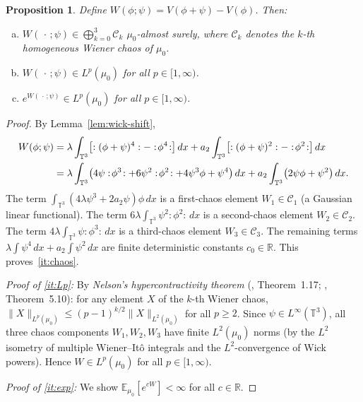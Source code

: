 \documentclass[12pt]{article}
\newtheorem{proposition}[theorem]{Proposition}
\theoremstyle{definition}
\begin{document}
\begin{proposition}
\label{prop:W}
Define $W(\phi;\psi) = V(\phi+\psi) - V(\phi)$. Then:
\begin{enumerate}[(a)]
  \item\label{it:chaos} $W(\,\cdot\,;\psi) \in \bigoplus_{k=0}^{3}\mathcal{C}_k$ $\mu_0$-almost
    surely, where $\mathcal{C}_k$ denotes the $k$-th homogeneous Wiener chaos of $\mu_0$.
  \item\label{it:Lp} $W(\,\cdot\,;\psi) \in L^p(\mu_0)$ for all $p \in [1,\infty)$.
  \item\label{it:exp} $e^{W(\,\cdot\,;\psi)} \in L^p(\mu_0)$ for all $p \in [1,\infty)$.
\end{enumerate}
\end{proposition}

\begin{proof}
By Lemma~\ref{lem:wick-shift},
\begin{align}
  W(\phi;\psi)
  &= \lambda\int_{\mathbb{T}^3}\bigl[:(\phi+\psi)^4: - :\!\phi^4\!:\bigr]\,dx
    + a_2\int_{\mathbb{T}^3}\bigl[:(\phi+\psi)^2: - :\!\phi^2\!:\bigr]\,dx \notag\\
  &= \lambda\int_{\mathbb{T}^3}\bigl(4\psi:\!\phi^3\!: + 6\psi^2:\!\phi^2\!:
    + 4\psi^3\phi + \psi^4\bigr)\,dx
    + a_2\int_{\mathbb{T}^3}\bigl(2\psi\phi + \psi^2\bigr)\,dx. \label{eq:Wexpand}
\end{align}
The term $\int_{\mathbb{T}^3}(4\lambda\psi^3 + 2a_2\psi)\phi\,dx$ is a first-chaos element
$W_1 \in \mathcal{C}_1$ (a Gaussian linear functional). The term
$6\lambda\int_{\mathbb{T}^3}\psi^2:\!\phi^2\!:\,dx$ is a second-chaos element
$W_2 \in \mathcal{C}_2$. The term $4\lambda\int_{\mathbb{T}^3}\psi:\!\phi^3\!:\,dx$ is a
third-chaos element $W_3 \in \mathcal{C}_3$. The remaining terms
$\lambda\int\psi^4\,dx + a_2\int\psi^2\,dx$ are finite deterministic constants $c_0 \in \mathbb{R}$.
This proves~\eqref{it:chaos}.

\emph{Proof of \eqref{it:Lp}:} By \emph{Nelson's hypercontractivity theorem}
(\cite{glimmjaffe}, Theorem~1.17; \cite{janson}, Theorem~5.10): for any element $X$ of the
$k$-th Wiener chaos, $\|X\|_{L^p(\mu_0)} \leq (p-1)^{k/2}\|X\|_{L^2(\mu_0)}$ for all $p \geq 2$.
Since $\psi \in L^\infty(\mathbb{T}^3)$, all three chaos components $W_1, W_2, W_3$ have finite
$L^2(\mu_0)$ norms (by the $L^2$ isometry of multiple Wiener--It\^{o} integrals and the
$L^2$-convergence of Wick powers). Hence $W \in L^p(\mu_0)$ for all $p \in [1,\infty)$.

\emph{Proof of \eqref{it:exp}:} We show $\mathbb{E}_{\mu_0}[e^{cW}] < \infty$ for all $c \in \mathbb{R}$.


\end{proof}
\end{document}

